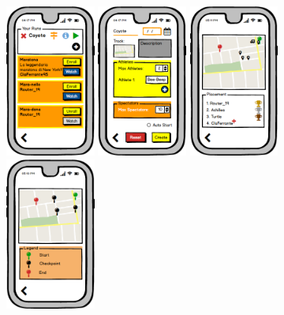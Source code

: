 \documentclass[a4paper]{article}
\begin{document}
        \begin{figure}[!htpb]
    	\centering
    	\includegraphics[height=50mm]{images/mockups/RunManager.png}
    	\includegraphics[height=50mm]{images/mockups/RunCreate.png}
    	\includegraphics[height=50mm]{images/mockups/ShowMap.png}
    	\includegraphics[height=50mm]{images/mockups/DefineTrack.png}
        \end{figure}
     \hfill
\end{document}
